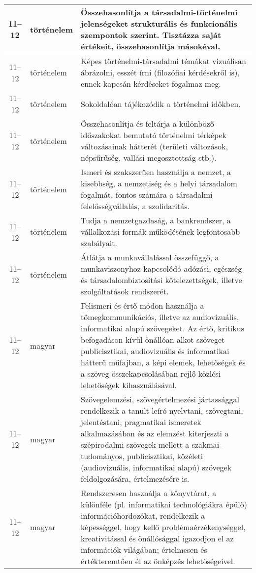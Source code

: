 \begin{small}
\begin{longtable}{c | p{2cm} |  p{11cm} }
              11--12 & történelem & Összehasonlítja a társadalmi-történelmi jelenségeket strukturális és funkcionális szempontok szerint. Tisztázza saját értékeit, összehasonlítja másokéval. \\ \hline
              11--12 & történelem & Képes történelmi-társadalmi témákat vizuálisan ábrázolni, esszét írni (filozófiai kérdésekről is), ennek kapcsán kérdéseket fogalmaz meg. \\ \hline
              11--12 & történelem & Sokoldalóan tájékozódik a történelmi időkben. \\ \hline
              11--12 & történelem & Összehasonlítja és feltárja a különböző időszakokat bemutató történelmi térképek változásainak hátterét (területi változások, népsűrűség, vallási megosztottság stb.). \\ \hline
              11--12 & történelem & Ismeri és szakszerűen használja a nemzet, a kisebbség, a nemzetiség és a helyi társadalom fogalmát, fontos számára a társadalmi felelősségvállalás, a szolidaritás. \\ \hline
              11--12 & történelem & Tudja a nemzetgazdaság, a bankrendszer, a vállalkozási formák működésének legfontosabb szabályait. \\ \hline
              11--12 & történelem & Átlátja a munkavállalással összefüggő, a munkaviszonyhoz kapcsolódó adózási, egészség- és társadalombiztosítási kötelezettségek, illetve szolgáltatások rendszerét. \\ \hline
              11--12 & magyar & Felismeri és értő módon használja a tömegkommunikációs, illetve az audiovizuális, informatikai alapú szövegeket. Az értő, kritikus befogadáson kívül önállóan alkot szöveget  publicisztikai, audiovizuális és informatikai hátterű műfajban, a képi elemek, lehetőségek és a szöveg összekapcsolásában rejlő közlési lehetőségek kihasználásával. \\ \hline
              11--12 & magyar & Szövegelemzési, szövegértelmezési jártassággal rendelkezik a tanult leíró nyelvtani, szövegtani, jelentéstani, pragmatikai ismeretek alkalmazásában és az elemzést kiterjeszti a szépirodalmi szövegek mellett a szakmai-tudományos, publicisztikai, közéleti (audiovizuális, informatikai alapú) szövegek feldolgozására, értelmezésére is. \\ \hline
              11--12 & magyar & Rendszeresen használja a könyvtárat, a különféle (pl. informatikai technológiákra épülő) információhordozókat, rendelkezik a képességgel, hogy kellő problémaérzékenységgel, kreativitással és önállósággal igazodjon el az információk világában; értelmesen és értékteremtően él az önképzés lehetőségeivel. \\ \hline

\end{longtable}
\end{small}

